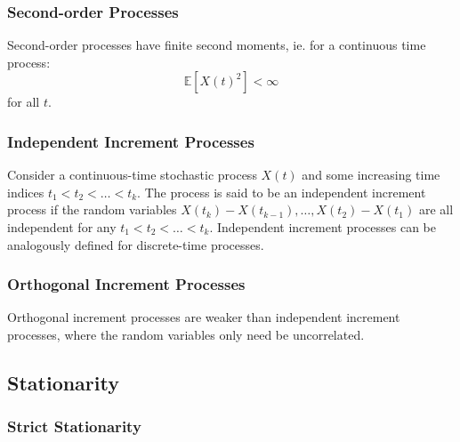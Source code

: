 \documentclass[11pt]{report} %
\begin{document}
\subsubsection{Second-order Processes}

Second-order processes have finite second moments, ie. for a continuous time process:
\begin{equation}
\mathbb{E}\left[X\left(t\right)^{2}\right] < \infty
\end{equation}
for all $t$.

\subsubsection{Independent Increment Processes}

Consider a continuous-time stochastic process $X\left(t\right)$ and some increasing time indices $t_{1} < t_{2} < \dots < t_{k}$. The process is said to be an independent increment process if the random variables $X\left(t_{k}\right) - X\left(t_{k - 1}\right), \dots, X\left(t_{2}\right) - X\left(t_{1}\right)$ are all independent for any $t_{1} < t_{2} < \dots < t_{k}$. Independent increment processes can be analogously defined for discrete-time processes.

\subsubsection{Orthogonal Increment Processes}

Orthogonal increment processes are weaker than independent increment processes, where the random variables only need be uncorrelated.

\subsection{Stationarity}

\subsubsection{Strict Stationarity}
\end{document}
